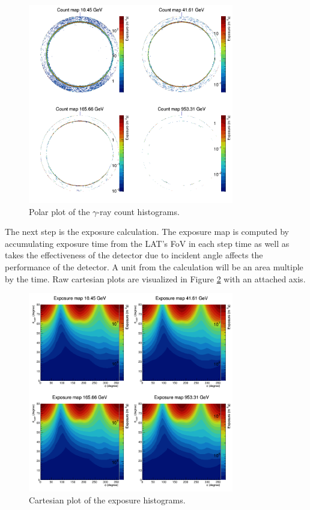 \begin{figure}[h!]
    \centering
    \includegraphics[width=0.8\textwidth]{content/result_and_discussion/figures/polar_cntmaps.png}
    \caption{Polar plot of the $\gamma$-ray count histograms.}
    \label{fig:cntmap_polar}
\end{figure}


The next step is the exposure calculation.
The exposure map is computed 
by accumulating exposure time from the LAT's FoV
in each step time as well as takes the 
effectiveness of the detector due to incident angle
affects the performance of the detector.
A unit from the calculation will be an 
area multiple by the time. Raw cartesian plots are visualized in
Figure \ref{fig:expmap_cartesian} with an attached axis.

\begin{figure}[h!]
    \centering
    \includegraphics[width=0.8\textwidth]{content/result_and_discussion/figures/cartesian_expmaps.png}
    \caption{Cartesian plot of the exposure histograms.}
    \label{fig:expmap_cartesian}
\end{figure}


